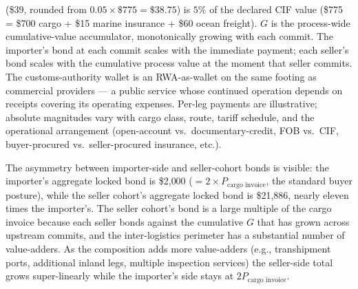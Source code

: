 \documentclass[11pt,a4paper]{article}
\theoremstyle{definition}
\theoremstyle{remark}
\begin{document}
\begin{table}[h]
{(\$39, rounded from $0.05 \times \$775 = \$38.75$) is $5\%$ of
the declared CIF value (\$775 = \$700 cargo + \$15 marine
insurance + \$60 ocean freight). $G$ is the process-wide
cumulative-value accumulator, monotonically growing with each
commit. The importer's bond at each commit scales with the
immediate payment; each seller's bond scales with the cumulative
process value at the moment that seller commits. The
customs-authority wallet is an RWA-as-wallet on the same footing
as commercial providers --- a public service whose continued
operation depends on receipts covering its operating expenses.
Per-leg payments are illustrative; absolute magnitudes vary with
cargo class, route, tariff schedule, and the operational
arrangement (open-account vs.\ documentary-credit, FOB vs.\ CIF,
buyer-procured vs.\ seller-procured insurance, etc.).}
\label{tab:k-bond-posture}
\end{table}

The asymmetry between importer-side and seller-cohort bonds is
visible: the importer's aggregate locked bond is \$2{,}000
($= 2 \times P_{\text{cargo invoice}}$, the standard buyer
posture), while the seller cohort's aggregate locked bond is
\$21{,}886, nearly eleven times the importer's. The seller cohort's
bond is a large multiple of the cargo invoice because each seller
bonds against the cumulative $G$ that has grown across upstream
commits, and the inter-logistics perimeter has a substantial
number of value-adders. As the composition adds more value-adders
(e.g., transhipment ports, additional inland legs, multiple
inspection services) the seller-side total grows super-linearly
while the importer's side stays at $2 P_{\text{cargo invoice}}$.
\end{document}
